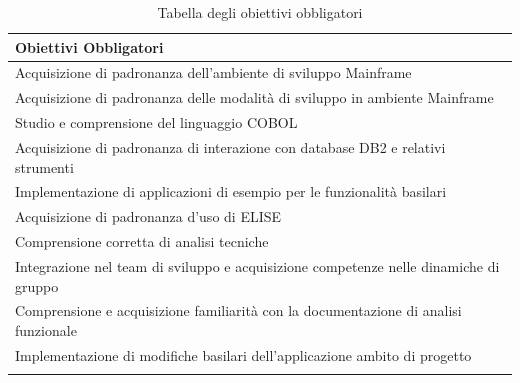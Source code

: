 		\begin{center}
		  \bgroup
		  \def\arraystretch{1.4}
		   \setlength\arrayrulewidth{0.6pt}
		   \begin{longtable}{ | p{11cm} |} \hline
		    \cellcolor[gray]{0.9} \textbf{Obiettivi Obbligatori} \\ \hline

			 Acquisizione di padronanza dell'ambiente di sviluppo Mainframe  \\ \hline
			 Acquisizione di padronanza delle modalità di sviluppo in ambiente Mainframe \\ \hline
			 Studio e comprensione del linguaggio COBOL\glossario \\ \hline
			 Acquisizione di padronanza di interazione con database DB2 e relativi strumenti \\ \hline
			 Implementazione di applicazioni di esempio per le funzionalità basilari \\ \hline
			 Acquisizione di padronanza d'uso di ELISE \\ \hline
			 Comprensione corretta di analisi tecniche \\ \hline
			 Integrazione nel team di sviluppo e acquisizione competenze nelle dinamiche di gruppo \\ \hline
			 Comprensione e acquisizione familiarità con la documentazione di analisi funzionale \\ \hline
			 Implementazione di modifiche basilari dell'applicazione ambito di progetto \\ \hline
			
			\caption{Tabella degli obiettivi obbligatori}
			
		    \end{longtable}
		  \egroup
		\end{center}
		

